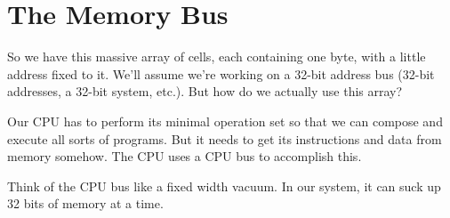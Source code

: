 \documentclass[12pt]{article}
\begin{document}
\section*{The Memory Bus}

So we have this massive array of cells, each containing one byte, with a little address fixed to it. We'll assume we're working on a 32-bit address bus (32-bit addresses, a 32-bit system, etc.). But how do we actually use this array?

Our CPU has to perform its minimal operation set so that we can compose and execute all sorts of programs. But it needs to get its instructions and data from memory somehow. The CPU uses a CPU bus to accomplish this.

Think of the CPU bus like a fixed width vacuum. In our system, it can suck up 32 bits of memory at a time.

\begin{center}
\end{center}
\end{document}
